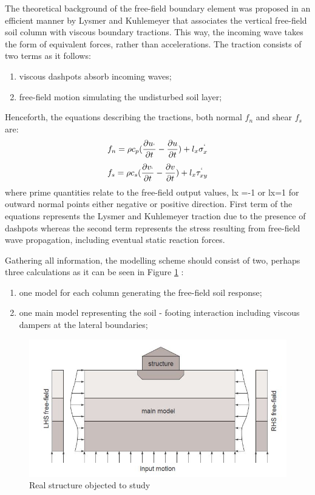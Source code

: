 	The theoretical background of the free-field boundary element was proposed in an efficient manner by Lysmer and Kuhlemeyer that associates the vertical free-field soil column with viscous boundary tractions. This way, the incoming wave takes the form of equivalent forces, rather than accelerations. The traction consists of two terms as it follows:
	\begin{enumerate}
		\item viscous dashpots absorb incoming waves;
		\item free-field motion simulating the undisturbed soil layer;
	\end{enumerate}
Henceforth, the equations describing the tractions, both normal $f_n$ and shear $f_s$ are:
\begin{equation}
	f_n=\rho c_p (\frac{\partial u_`}{\partial t}-\frac{\partial u}{\partial t})+l_x \sigma^`_x
\end{equation}
\begin{equation}
f_s=\rho c_s (\frac{\partial v_`}{\partial t}-\frac{\partial v}{\partial t})+l_x \tau^`_{xy}
\end{equation}
where prime quantities relate to the free-field output values, lx =-1 or lx=1 for outward normal points either negative or positive direction. First term of the equations represents the Lysmer and Kuhlemeyer traction due to the presence of dashpots whereas the second term represents the stress resulting from free-field wave propagation, including eventual static reaction forces.

Gathering all information, the modelling scheme should consist of two, perhaps three calculations as it can be seen in Figure \ref{ff} :
\begin{enumerate}
	\item one model for each column generating the free-field soil response;
	\item one main model representing the soil - footing interaction including viscous dampers at the lateral boundaries;
\end{enumerate} 

	\begin{figure}[!h]
		\centering
		\includegraphics[width=0.7\linewidth]{"free-field"}
		\caption{Real structure objected to study}
		\label{ff}
	\end{figure} 
	
